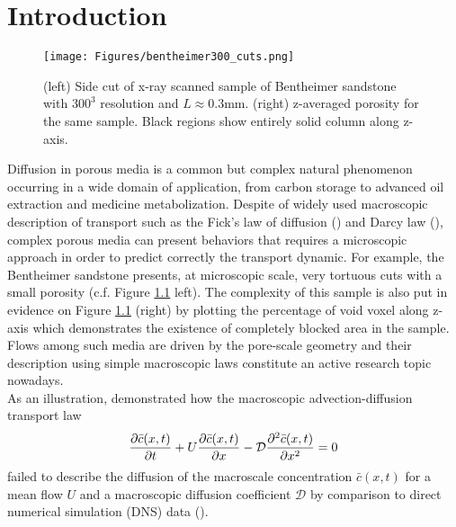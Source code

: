 \chapter{Introduction}
\begin{figure}
	\centering
	\texttt{[image: Figures/bentheimer300\_cuts.png]}
	\caption{(left) Side cut of x-ray scanned sample of Bentheimer sandstone with $300^3$ resolution and $L\approx0.3$mm. (right) z-averaged porosity for the same sample. Black regions show entirely solid column along z-axis.}
	\label{fig:bentheimer300cuts}
\end{figure}
Diffusion in porous media is a common but complex natural phenomenon occurring in a wide domain of application, from carbon storage to advanced oil extraction and medicine metabolization.
Despite of widely used macroscopic description of transport such as the Fick's law of diffusion (\citet{Fick1855}) and Darcy law (\citet{Darcy1856}), complex porous media can present behaviors that requires a microscopic approach in order to predict correctly the transport dynamic.
For example, the Bentheimer sandstone presents, at microscopic scale, very tortuous cuts with a small porosity (c.f. Figure \ref{fig:bentheimer300cuts} left).
The complexity of this sample is also put in evidence on Figure \ref{fig:bentheimer300cuts} (right) by plotting the percentage of void voxel along z-axis which demonstrates the existence of completely blocked area in the sample.
Flows among such media are driven by the pore-scale geometry and their description using simple macroscopic laws constitute an active research topic nowadays.\\
As an illustration, \citet{Dentz2017} demonstrated how the macroscopic advection-diffusion transport law
\begin{equation}
	\pdv{\bar{c}(x,t)}{t}+U\pdv{\bar{c}(x,t)}{x}-\mathcal{D}\pdv[2]{\bar{c}(x,t)}{x}=0
\label{eq:adv_diff}
\end{equation}
failed to describe the diffusion of the macroscale concentration $\bar{c}(x,t)$ for a mean flow $U$ and a macroscopic diffusion coefficient $\mathcal{D}$ by comparison to direct numerical simulation (DNS) data (\citet[Fig. 3]{Dentz2017}).\\


